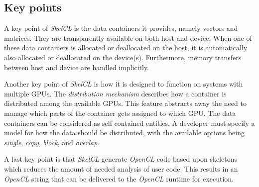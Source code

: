 \subsection{Key points}
A key point of \textit{SkelCL} is the data containers it provides, namely vectors and matrices. They are transparently available on both host and device. When one of these data containers is allocated or deallocated on the host, it is automatically also allocated or deallocated on the device(s). Furthermore, memory transfers between host and device are handled implicitly.

Another key point of \textit{SkelCL} is how it is designed to function on systems with multiple GPUs. The \textit{distribution mechanism} describes how a container is distributed among the available GPUs. This feature abstracts away the need to manage which parts of the container gets assigned to which GPU. The data containers can be considered as self contained entities. A developer must specify a model for how the data should be distributed, with the available options being \textit{single}, \textit{copy}, \textit{block}, and \textit{overlap}.

A last key point is that \textit{SkelCL} generate \textit{OpenCL} code based upon skeletons which reduces the amount of needed analysis of user code. This results in an \textit{OpenCL} string that can be delivered to the \textit{OpenCL} runtime for execution.